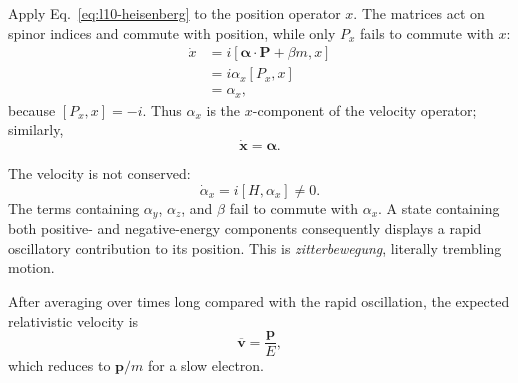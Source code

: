Apply Eq.~\eqref{eq:l10-heisenberg} to the position operator \(x\). The matrices act on spinor indices and commute with position, while only \(P_x\) fails to commute with \(x\):
\begin{align}
\dot x
&=i[\boldsymbol{\alpha}\cdot\mathbf P+\beta m,x]\\
&=i\alpha_x[P_x,x]\\
&=\alpha_x,
\label{eq:l10-velocity}
\end{align}
because \([P_x,x]=-i\). Thus \(\alpha_x\) is the \(x\)-component of the velocity operator; similarly,
\begin{equation}
\dot{\mathbf x}=\boldsymbol{\alpha}.
\end{equation}

\begin{classroomqa}
\end{classroomqa}

The velocity is not conserved:
\begin{equation}
\dot\alpha_x=i[H,\alpha_x]\ne0.
\end{equation}
The terms containing \(\alpha_y\), \(\alpha_z\), and \(\beta\) fail to commute with \(\alpha_x\). A state containing both positive- and negative-energy components consequently displays a rapid oscillatory contribution to its position. This is \emph{zitterbewegung}, literally trembling motion.

After averaging over times long compared with the rapid oscillation, the expected relativistic velocity is
\begin{equation}
\overline{\mathbf v}=\frac{\mathbf p}{E},
\end{equation}
which reduces to \(\mathbf p/m\) for a slow electron.

\begin{classroomqa}
\end{classroomqa}

